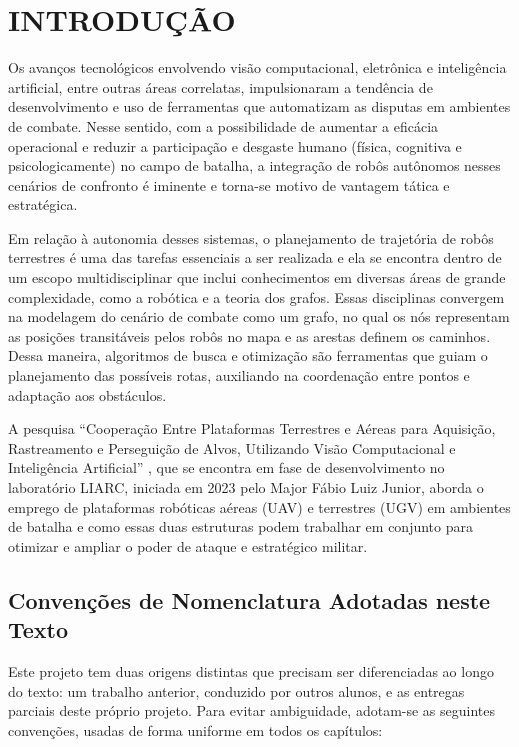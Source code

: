 \documentclass[
    12pt,
    openright,
    oneside,
    a4paper,
    english,
    brazil
]{abntex2}
\begin{document}
\chapter{INTRODUÇÃO}

Os avanços tecnológicos envolvendo visão computacional, eletrônica e inteligência artificial, entre outras áreas correlatas, impulsionaram a tendência de desenvolvimento e uso de ferramentas que automatizam as disputas em ambientes de combate. Nesse sentido, com a possibilidade de aumentar a eficácia operacional e reduzir a participação e desgaste humano (física, cognitiva e psicologicamente) no campo de batalha, a integração de robôs autônomos nesses cenários de confronto é iminente e torna-se motivo de vantagem tática e estratégica.

Em relação à autonomia desses sistemas, o planejamento de trajetória de robôs terrestres é uma das tarefas essenciais a ser realizada e ela se encontra dentro de um escopo multidisciplinar que inclui conhecimentos em diversas áreas de grande complexidade, como a robótica e a teoria dos grafos. Essas disciplinas convergem na modelagem do cenário de combate como um grafo, no qual os nós representam as posições transitáveis pelos robôs no mapa e as arestas definem os caminhos. Dessa maneira, algoritmos de busca e otimização são ferramentas que guiam o planejamento das possíveis rotas, auxiliando na coordenação entre pontos e adaptação aos obstáculos.

A pesquisa ``Cooperação Entre Plataformas Terrestres e Aéreas para Aquisição, Rastreamento e Perseguição de Alvos, Utilizando Visão Computacional e Inteligência Artificial'' \cite{junior2024}, que se encontra em fase de desenvolvimento no laboratório LIARC, iniciada em 2023 pelo Major Fábio Luiz Junior, aborda o emprego de plataformas robóticas aéreas (UAV) e terrestres (UGV) em ambientes de batalha e como essas duas estruturas podem trabalhar em conjunto para otimizar e ampliar o poder de ataque e estratégico militar.

\section{Convenções de Nomenclatura Adotadas neste Texto}
\label{sec:nomenclatura}

Este projeto tem duas origens distintas que precisam ser diferenciadas ao longo do texto: um trabalho anterior, conduzido por outros alunos, e as entregas parciais deste próprio projeto. Para evitar ambiguidade, adotam-se as seguintes convenções, usadas de forma uniforme em todos os capítulos:
\end{document}
